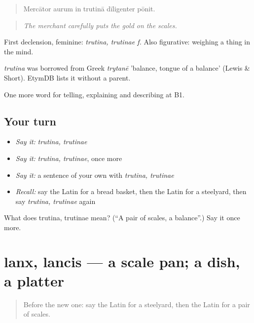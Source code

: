 \begin{quote}
Mercātor aurum in trutinā dīligenter pōnit.
\end{quote}

\begin{quote}
\emph{The merchant carefully puts the gold on the scales.}
\end{quote}

First declension, feminine: \emph{trutina, trutinae f.} Also figurative: weighing a thing in the mind.

\begin{cousinweb}
\emph{trutina} was borrowed from Greek \emph{trytanē} 'balance, tongue of a balance' (Lewis \& Short). EtymDB lists it without a parent.
\end{cousinweb}

\begin{grammarlens}[title={What you've built}]
One more word for telling, explaining and describing at B1.
\end{grammarlens}

\subsection*{Your turn}
\begin{itemize}
\raggedright
  \item \emph{Say it:} \emph{trutina, trutinae}
  \item \emph{Say it:} \emph{trutina, trutinae}, once more
  \item \emph{Say it:} a sentence of your own with \emph{trutina, trutinae}
  \item \emph{Recall:} say the Latin for a bread basket, then the Latin for a steelyard, then say \emph{trutina, trutinae} again
\end{itemize}

\begin{tcolorbox}[breakable,colback=teal!4,colframe=teal!35!black,title={Before you move on}]
What does trutina, trutinae mean? (\textquotedblleft{}A pair of scales, a balance\textquotedblright{}.) Say it once more.
\end{tcolorbox}
\section[lanx, lancis]{lanx, lancis — a scale pan; a dish, a platter}

\label{lesson:LA-C464-lanx}



\begin{quote}
Before the new one: say the Latin for a steelyard, then the Latin for a pair of scales.
\end{quote}

